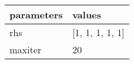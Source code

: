 \begin{longtable}[]{@{}ll@{}}
\toprule
parameters & values\tabularnewline
\midrule
\endhead
rhs & {[}1, 1, 1, 1, 1{]}\tabularnewline
maxiter & 20\tabularnewline
\bottomrule
\end{longtable}
